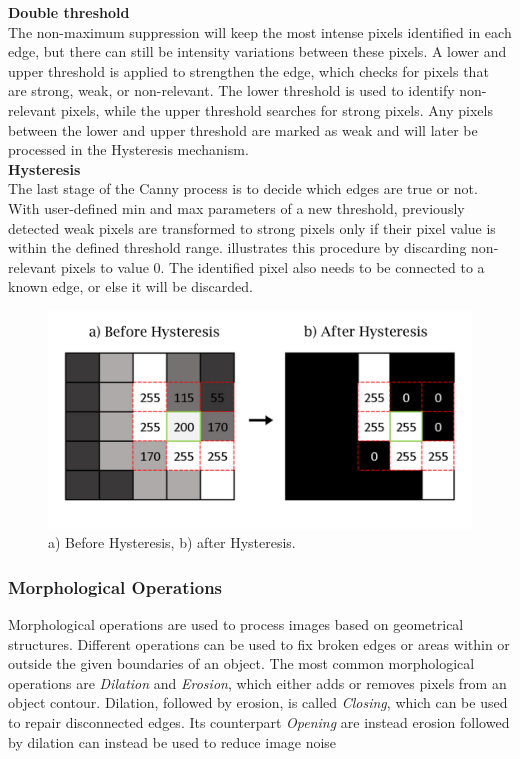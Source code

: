 \noindent \textbf{Double threshold}\\
\noindent The non-maximum suppression will keep the most intense pixels identified in each edge, but there can still be intensity variations between these pixels. A lower and upper threshold is applied to strengthen the edge, which checks for pixels that are strong, weak, or non-relevant. The lower threshold is used to identify non-relevant pixels, while the upper threshold searches for strong pixels. Any pixels between the lower and upper threshold are marked as weak and will later be processed in the Hysteresis mechanism.\\ 

\noindent \textbf{Hysteresis}\\
\noindent The last stage of the Canny process is to decide which edges are true or not. With user-defined min and max parameters of a new threshold, previously detected weak pixels are transformed to strong pixels only if their pixel value is within the defined threshold range.  illustrates this procedure by discarding non-relevant pixels to value 0. The identified pixel also needs to be connected to a known edge, or else it will be discarded. \\

\begin{figure}[H]
    \centering
    \includegraphics[width=.65\linewidth]{figures/PDF/Hysteresis.pdf}
    \caption{a) Before Hysteresis, b) after Hysteresis.}
    \label{fig:hysteresis}
\end{figure}

\subsubsection{Morphological Operations}
Morphological operations are used to process images based on geometrical structures. Different operations can be used to fix broken edges or areas within or outside the given boundaries of an object. The most common morphological operations are \textit{Dilation} and \textit{Erosion}\cite{Raid}, which either adds or removes pixels from an object contour. Dilation, followed by erosion, is called \textit{Closing}, which can be used to repair disconnected edges. Its counterpart \textit{Opening} are instead erosion followed by dilation can instead be used to reduce image noise \\


